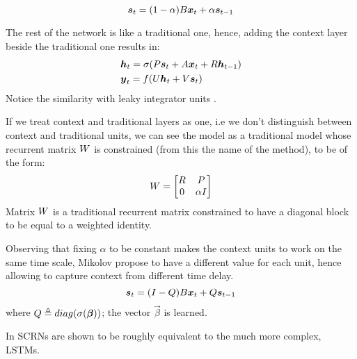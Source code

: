\begin{equation}
 \boldsymbol{s}_t = (1-\alpha)B\boldsymbol{x}_t + \alpha\boldsymbol{s}_{t-1}
\end{equation}

The rest of the network is like a traditional one, hence, adding the context layer beside the traditional one results 
in:
\begin{align}
 &\boldsymbol{h}_t = \sigma(P\boldsymbol{s}_t + A\boldsymbol{x}_t + R\boldsymbol{h}_{t-1})\\
 &\boldsymbol{y}_t = f(U\boldsymbol{h}_t + V\boldsymbol{s}_t)
\end{align}
Notice the similarity with leaky integrator units \cite{leakyIntegratorUnits}.

If we treat context and traditional layers as one, i.e we don't distinguish between context and traditional units, we can 
see the model as a traditional model whose recurrent matrix $W$ is constrained (from this the name of the 
method), to be of the form:
\begin{equation}
 W =  \begin{bmatrix}
R & P \\
0 & \alpha I
\end{bmatrix}
\end{equation}
Matrix $W$ is a traditional recurrent matrix constrained to have a diagonal block to be equal to a weighted 
identity. 

Observing that fixing $\alpha$ to be constant makes the context units to work on the same time scale, Mikolov propose 
to have a different value for each unit, hence allowing to capture context from different time delay.
\begin{equation}
  \boldsymbol{s}_t = (I-Q)B\boldsymbol{x}_t + Q\boldsymbol{s}_{t-1}
\end{equation}
where $Q\triangleq diag(\sigma(\boldsymbol{\beta}))$; the vector $\vec{\beta}$ is learned.

In \cite{scrn} SCRNs are shown to be roughly equivalent to the much more complex, LSTMs.


